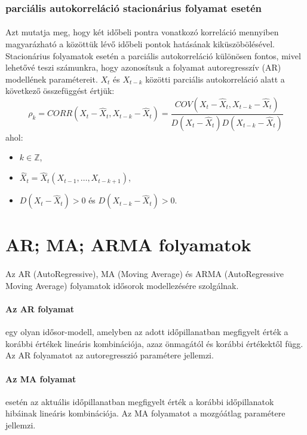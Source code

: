 \documentclass[11pt,a4paper]{article}
\begin{document}
					\subsubsection{parciális autokorreláció stacionárius folyamat esetén}
						\paragraph{}
							Azt mutatja meg, hogy két időbeli pontra vonatkozó korreláció mennyiben magyarázható a közöttük lévő időbeli pontok hatásának kiküszöbölésével. Stacionárius folyamatok esetén a parciális autokorreláció különösen fontos, mivel lehetővé teszi számunkra, hogy azonosítsuk a folyamat autoregresszív (AR) modellének paramétereit.
							$X_t$ és $X_{t-k}$ közötti parciális autokorreláció alatt a következő összefüggést értjük:
							\[
							\rho_k = CORR(X_t - \widehat{X}_t, X_{t-k} - \widehat{X}_{t}) = \frac{COV(X_t - \widehat{X}_t, X_{t-k} - \widehat{X}_{t})}{D(X_t - \widehat{X}_t)D(X_{t-k} - \widehat{X}_{t})}
							\]
							ahol:
							\begin{itemize}
								\item $k \in \mathbb{Z}$,
								\item $\widehat{X}_t = \widehat{X}_t(X_{t-1}, \dots, X_{t-k+1})$,
								\item $D(X_t - \hat{X}_t) > 0$ és $D(X_{t-k} - \hat{X}_t) > 0$.
							\end{itemize}
			
			\section{AR; MA; ARMA folyamatok}
				\paragraph{}
					Az AR (AutoRegressive), MA (Moving Average) és ARMA (AutoRegressive Moving Average) folyamatok idősorok modellezésére szolgálnak.
				\paragraph{Az AR folyamat}
					egy olyan idősor-modell, amelyben az adott időpillanatban megfigyelt érték a korábbi értékek lineáris kombinációja, azaz önmagától és korábbi értékektől függ. Az AR folyamatot az autoregresszió paramétere jellemzi.
				\paragraph{Az MA folyamat}
					esetén az aktuális időpillanatban megfigyelt érték a korábbi időpillanatok hibáinak lineáris kombinációja. Az MA folyamatot a mozgóátlag paramétere jellemzi.
\end{document}
